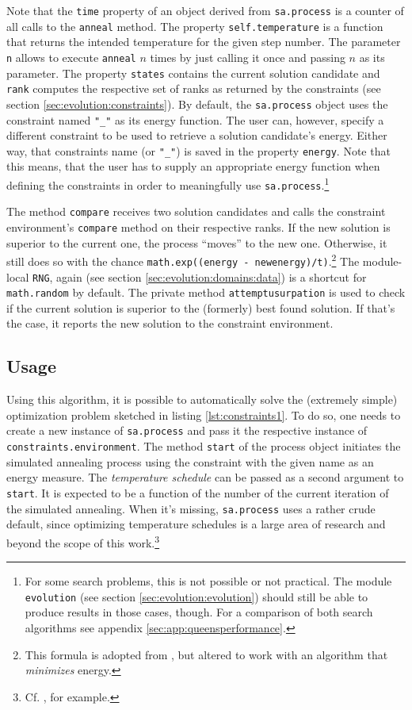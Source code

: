 Note that the \texttt{time} property of an object derived from \texttt{sa.process} is a counter of all calls to the \texttt{anneal} method. The property \texttt{self.temperature} is a function that returns the intended temperature for the given step number. The parameter \texttt{n} allows to execute \texttt{anneal} $n$ times by just calling it once and passing $n$ as its parameter. The property \texttt{states} contains the current solution candidate and \texttt{rank} computes the respective set of ranks as returned by the constraints (see section \ref{sec:evolution:constraints}). By default, the \texttt{sa.process} object uses the constraint named \texttt{"\_"} as its energy function. The user can, however, specify a different constraint to be used to retrieve a solution candidate's energy. Either way, that constraints name (or \texttt{"\_"}) is saved in the property \texttt{energy}. Note that this means, that the user has to supply an appropriate energy function when defining the constraints in order to meaningfully use \texttt{sa.process}.\footnote{For some search problems, this is not possible or not practical. The module \texttt{evolution} (see section \ref{sec:evolution:evolution}) should still be able to produce results in those cases, though. For a comparison of both search algorithms see appendix \ref{sec:app:queensperformance}.}

The method \texttt{compare} receives two solution candidates and calls the constraint environment's \texttt{compare} method on their respective ranks. If the new solution is superior to the current one, the process ``moves'' to the new one. Otherwise, it still does so with the chance \texttt{math.exp((energy - newenergy)/t)}.\footnote{This formula is adopted from \cite{RussellNorvig2003}, but altered to work with an algorithm that \emph{minimizes} energy.} The module-local \texttt{RNG}, again (see section \ref{sec:evolution:domains:data}) is a shortcut for \texttt{math.random} by default. The private method \texttt{attemptusurpation} is used to check if the current solution is superior to the (formerly) best found solution. If that's the case, it reports the new solution to the constraint environment.

\subsection{Usage}

Using this algorithm, it is possible to automatically solve the (extremely simple) optimization problem sketched in listing \ref{lst:constraints1}. To do so, one needs to create a new instance of \texttt{sa.process} and pass it the respective instance of \texttt{constraints.environment}. The method \texttt{start} of the process object initiates the simulated annealing process using the constraint with the given name as an energy measure. The \emph{temperature schedule} can be passed as a second argument to \texttt{start}. It is expected to be a function of the number of the current iteration of the simulated annealing. When it's missing, \texttt{sa.process} uses a rather crude default, since optimizing temperature schedules is a large area of research and beyond the scope of this work.\footnote{Cf. \cite{Lam88}, for example.}

